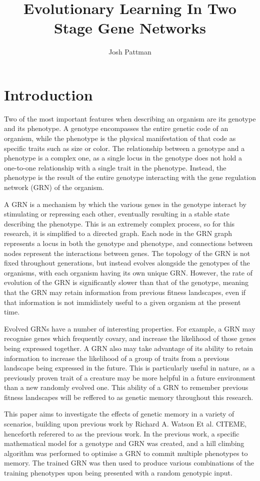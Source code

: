 \documentclass[twocolumn,a4paper,12pt]{article}
\author{Josh Pattman}
\title{Evolutionary Learning In Two Stage Gene Networks}
\begin{document}
	\maketitle
    \section{Introduction}
    Two of the most important features when describing an organism are its genotype and its phenotype. A genotype encompasses the entire genetic code of an organism, while the phenotype is the physical manifestation of that code as specific traits such as size or color. The relationship between a genotype and a phenotype is a complex one, as a single locus in the genotype does not hold a one-to-one relationship with a single trait in the phenotype. Instead, the phenotype is the result of the entire genotype interacting with the gene regulation network (GRN) of the organism.

    A GRN is a mechanism by which the various genes in the genotype interact by stimulating or repressing each other, eventually resulting in a stable state describing the phenotype. This is an extremely complex process, so for this research, it is simplified to a directed graph. Each node in the GRN graph represents a locus in both the genotype and phenotype, and connections between nodes represent the interactions between genes. The topology of the GRN is not fixed throughout generations, but instead evolves alongside the genotypes of the organisms, with each organism having its own unique GRN. However, the rate of evolution of the GRN is significantly slower than that of the genotype, meaning that the GRN may retain information from previous fitness landscapes, even if that information is not immidiately useful to a given organism at the present time.

    Evolved GRNs have a number of interesting properties. For example, a GRN may recognise genes which frequently covary, and increase the likelihood of those genes being expressed together. A GRN also may take advantage of its ability to retain information to increase the likelihood of a group of traits from a previous landscape being expressed in the future. This is particularly useful in nature, as a previously proven trait of a creature may be more helpful in a future environment than a new randomly evolved one. This ability of a GRN to remember previous fitness landscapes will be reffered to as genetic memory throughout this research.

    This paper aims to investigate the effects of genetic memory in a variety of scenarios, building upon previous work by Richard A. Watson Et al. CITEME, henceforth referered to as the previous work. In the previous work, a specific mathematical model for a genotype and GRN was created, and a hill climbing algorithm was performed to optimise a GRN to commit multiple phenotypes to memory. The trained GRN was then used to produce various combinations of the training phenotypes upon being presented with a random genotypic input.
\end{document}
